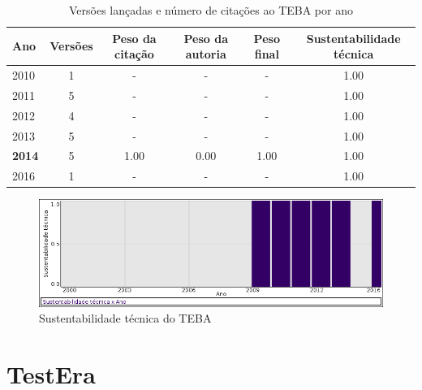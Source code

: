\begin{table}[H]
\caption{Versões lançadas e número de citações ao TEBA por ano}
\centering
\begin{tabular}{| l | c | c | c | c | c |}
  \hline
  Ano & Versões & Peso da citação & Peso da autoria & Peso final & Sustentabilidade técnica \\
  \hline
        2010 & 1 & - & - & -
        &
          {\color{blue} 1.00}
        \\
\hline
        2011 & 5 & - & - & -
        &
          {\color{blue} 1.00}
        \\
\hline
        2012 & 4 & - & - & -
        &
          {\color{blue} 1.00}
        \\
\hline
        2013 & 5 & - & - & -
        &
          {\color{blue} 1.00}
        \\
\hline
            {\bf 2014}
          &
          5
          &
          1.00
          &
          0.00
          &
          1.00
          &
            {\color{blue} 1.00}
          \\
\hline
        2016 & 1 & - & - & -
        &
          {\color{blue} 1.00}
        \\
\hline
\end{tabular}
\end{table}

\begin{figure}[h]
  \center
  \includegraphics[scale=0.50]{imagens/softwares-charts/teba.png}
  \caption{Sustentabilidade técnica do TEBA}
\end{figure}


\section{TestEra}


